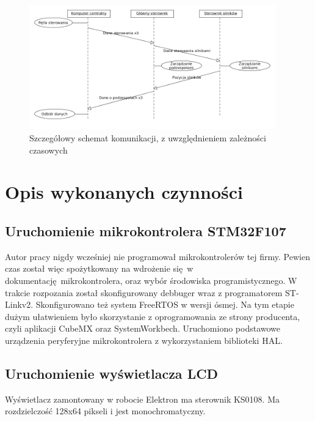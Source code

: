 \documentclass[a4paper, 12pt]{article}
\begin{document}
	\begin{figure}[ht]
	    \centering
	    \includegraphics[width=0.95\textwidth]{schemat_komunikacji_czasowy.png}
	    \caption{Szczegółowy schemat komunikacji, z uwzględnieniem zależności czasowych}
	    \label{img:komunikacjaCzasowa}
	\end{figure}
	\section{Opis wykonanych czynności}
	\subsection{Uruchomienie mikrokontrolera STM32F107}
	Autor pracy nigdy wcześniej nie programował mikrokontrolerów tej firmy. Pewien czas został więc spożytkowany na wdrożenie się w dokumentację mikrokontrolera, oraz wybór środowiska programistycznego. W trakcie rozpozania został skonfigurowany debbuger wraz z programatorem ST-Linkv2. Skonfigurowano też system FreeRTOS w wersji ósmej. Na tym etapie dużym ułatwieniem było skorzystanie z oprogramowania ze strony producenta, czyli aplikacji CubeMX oraz SystemWorkbech. Uruchomiono podstawowe urządzenia peryferyjne mikrokontrolera z wykorzystaniem biblioteki HAL.
	\subsection{Uruchomienie wyświetlacza LCD}
	Wyświetlacz zamontowany w robocie Elektron ma sterownik KS0108. Ma rozdzielczość 128x64 pikseli i jest monochromatyczny.
\end{document}
